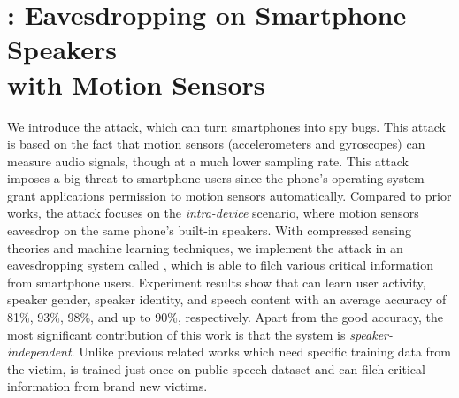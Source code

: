 \chapter{{\spp}: Eavesdropping on Smartphone Speakers\protect \\ with Motion Sensors}

We introduce the \textit{{\attackName}} attack, which can turn smartphones into spy bugs. This attack is based on the fact that motion sensors (accelerometers and gyroscopes) can measure audio signals, though at a much lower sampling rate. This attack imposes a big threat to smartphone users since the phone's operating system grant applications permission to motion sensors automatically. Compared to prior works, the {\attackName} attack focuses on the \textit{intra-device} scenario, where motion sensors eavesdrop on the same phone's built-in speakers. With compressed sensing theories and machine learning techniques, we implement the attack in an eavesdropping system called {\textit{\systemName}}, which is able to filch various critical information from smartphone users. Experiment results show that {\systemName} can learn user activity, speaker gender, speaker identity, and speech content with an average accuracy of 81\%, 93\%, 98\%, and up to 90\%, respectively. Apart from the good accuracy, the most significant contribution of this work is that the {\systemName} system is \textit{speaker-independent}. Unlike previous related works which need specific training data from the victim, {\systemName} is trained just once on public speech dataset and can filch critical information from brand new victims.

%

%

%
	
%
	
%

%

%

%

